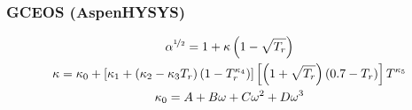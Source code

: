 \subsubsection{GCEOS (AspenHYSYS)}

\begin{gather}
\alpha^{\nicefrac{1}{2}} = 1 + \kappa \left(1 - \sqrt{T_r}\right)\\
\kappa = \kappa_0 + \left[ 
	\kappa_1 + \left(   \kappa_2 - \kappa_3 T_r   \right)
	\left(1 - T_r^{\kappa_4}\right) 
\right]
\left[
	\left(1 + \sqrt{T_r}\right)\left(0.7 - T_r\right)
\right]
T^{\kappa_5}\\
\kappa_0 = A + B \omega+ C \omega^2+ D \omega^3
\end{gather}
